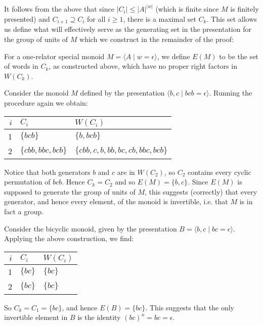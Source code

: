 \documentclass[noindex,noinsetproof,emphthm,12pt]{lmaths}
\begin{document}
It follows from the above that since $|C_i| \le |A|^{|w|}$ (which is finite since $M$ is finitely presented) and $C_{i+1} \supseteq C_i$ for all $i \ge 1$, there is a maximal set $C_k$. This set allows us define what will effectively serve as the generating set in the presentation for the group of units of $M$ which we construct in the remainder of the proof:

\begin{defn}
	For a one-relator special monoid $M = \langle A \mid w = \epsilon \rangle$, we define $E(M)$ to be the set of words in $C_k$, as constructed above, which have no proper right factors in $W(C_k)$.
\end{defn}

\begin{example} \label{ex:Ck-group}
	Consider the monoid $M$ defined by the presentation $\langle b, c \mid bcb = \epsilon \rangle$. Running the procedure again we obtain:

	\begin{center}
	\renewcommand{\arraystretch}{1.2}
	\begin{tabular}{r|ll}
		$i$ & $C_i$ & $W(C_i)$ \\ \hline
		1 & $\{bcb\}$ & $\{b, bcb\}$ \\
		2 & $\{cbb, bbc, bcb\}$ & $\{cbb, c, b, bb, bc, cb, bbc, bcb\}$
	\end{tabular}
	\end{center}

	Notice that both generators $b$ and $c$ are in $W(C_2)$, so $C_2$ contains every cyclic permutation of $bcb$. Hence $C_k = C_2$ and so $E(M) = \{ b, c\}$. Since $E(M)$ is supposed to generate the group of units of $M$, this suggests (correctly) that every generator, and hence every element, of the monoid is invertible, i.e. that $M$ is in fact a group. 
\end{example}

\begin{example}
	Consider the bicyclic monoid, given by the presentation $B = \langle b, c \mid bc = \epsilon \rangle$.
	Applying the above construction, we find:

	\begin{center}
	\renewcommand{\arraystretch}{1.2}
	\begin{tabular}{r|ll}
		$i$ & $C_i$ & $W(C_i)$ \\ \hline
		1 & $\{bc\}$ & $\{bc\}$ \\
		2 & $\{bc\}$ & $\{bc\}$
	\end{tabular}
	\end{center}

	So $C_k = C_1 = \{ bc \}$, and hence $E(B) = \{bc\}$. This suggests that the only invertible element in $B$ is the identity $(bc)^n = bc = \epsilon$.
\end{example}
\end{document}
